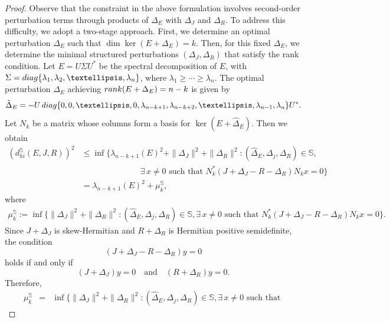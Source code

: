 \documentclass[10pt,a4paper]{amsart}
\newcommand{\diag}     {\mathop{\rm diag}\nolimits}
\newcommand{\rank}     {\mathop{\rm rank}\nolimits}
\begin{document}
\begin{proof}
    Observe that the constraint in the above formulation involves second-order perturbation terms through products of $\Delta_E$ with $\Delta_J$ and $\Delta_R$. To address this difficulty, we adopt a two-stage approach. First, we determine an optimal perturbation $\Delta_E$ such that $\dim \ker(E+\Delta_E) = k$. Then, for this fixed $\Delta_E$, we determine the minimal structured perturbations $(\Delta_J,\Delta_R)$ that satisfy the rank condition. Let $E = U \Sigma U^*$ be the spectral decomposition of $E$, with $\Sigma = \diag \{\lambda_1,\lambda_2,\ldots,\lambda_n\}$, where $\lambda_1 \ge \cdots \ge \lambda_n$. The optimal perturbation $\Delta_E$ achieving ${\rank}(E+\Delta_E)=n-k$ is given by
    \[
    \hat \Delta_E = - U \diag\{0,0,\ldots,0,\lambda_{n-k+1},\lambda_{n-k+2}, \ldots,\lambda_{n-1},\lambda_{n}\}U^*.%
    \]
    Let $N_k$ be a  matrix whose columns form a basis for $\ker(E+\hat \Delta_E)$.
    Then we obtain
    \begin{align}\label{Sd:muintro}
        (d_{hi}^{\mathbb S}(E,J,R))^2 &\leq  \inf\Big\{ \lambda_{n-k+1}(E)^2 + \|\Delta_J\|^2 + \|\Delta_R\|^2 : (\hat \Delta_E,\Delta_j,\Delta_R)\in \mathbb S,\nonumber \\ & \hspace{3cm} \exists\, x\neq 0 \text{ such that } N_k^* (J+\Delta_J-R-\Delta_R) N_k x = 0 \Big\}
        \nonumber\\
        &=\lambda_{n-k+1}(E)^2 + \mu_k^{\mathbb S},
    \end{align}
    where
    \begin{eqnarray}\label{hu_hi}
        \mu_k^{\mathbb S}:=\inf\Big\{ \|\Delta_J\|^2 + \|\Delta_R\|^2 : (\hat \Delta_E,\Delta_j,\Delta_R)\in \mathbb S,\exists\, x\neq 0 \text{ such that } N_k^* (J+\Delta_J-R-\Delta_R) N_k x = 0 \Big\}.
    \end{eqnarray}
    Since $J+\Delta_J$ is skew-Hermitian and $R+\Delta_R$ is Hermitian positive semidefinite, the condition
    \[
    (J+\Delta_J - R - \Delta_R)y = 0
    \]
    holds if and only if
    \[
    (J+\Delta_J)y = 0 \quad \text{and} \quad (R+\Delta_R)y = 0.
    \]
    Therefore,
    \begin{eqnarray}\label{eq:temp2}
        \mu_k^{\mathbb S} &= & \inf\Big\{  \|\Delta_J\|^2 + \|\Delta_R\|^2 : (\hat \Delta_E,\Delta_j,\Delta_R)\in \mathbb S, \exists\, x\neq 0 \text{ such that } \nonumber

\end{eqnarray}
\end{proof}
\end{document}
